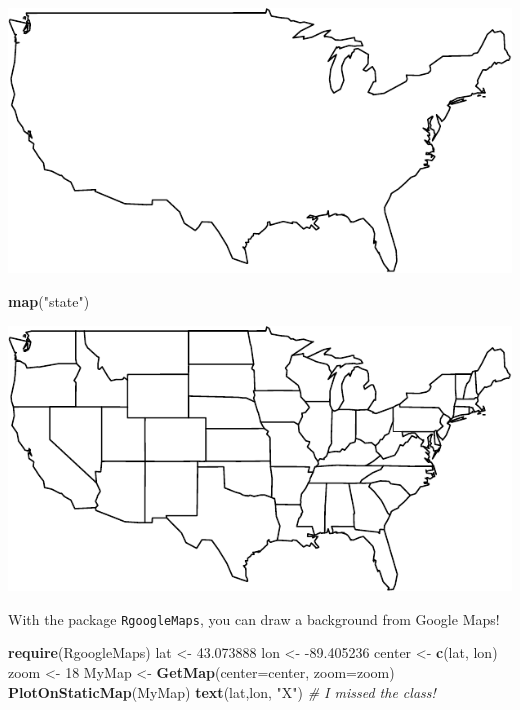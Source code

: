 \documentclass[]{article}
\newenvironment{Shaded}{\begin{snugshade}}{\end{snugshade}}
\newcommand{\KeywordTok}[1]{\textcolor[rgb]{0.13,0.29,0.53}{\textbf{{#1}}}}
\newcommand{\DataTypeTok}[1]{\textcolor[rgb]{0.13,0.29,0.53}{{#1}}}
\newcommand{\DecValTok}[1]{\textcolor[rgb]{0.00,0.00,0.81}{{#1}}}
\newcommand{\FloatTok}[1]{\textcolor[rgb]{0.00,0.00,0.81}{{#1}}}
\newcommand{\StringTok}[1]{\textcolor[rgb]{0.31,0.60,0.02}{{#1}}}
\newcommand{\CommentTok}[1]{\textcolor[rgb]{0.56,0.35,0.01}{\textit{{#1}}}}
\newcommand{\NormalTok}[1]{{#1}}
\numberwithin{equation}{section}
\begin{document}
\includegraphics{index_files/figure-latex/unnamed-chunk-239-1.pdf}

\begin{Shaded}
\begin{Highlighting}[]
\KeywordTok{map}\NormalTok{(}\StringTok{"state"}\NormalTok{)}
\end{Highlighting}
\end{Shaded}

\includegraphics{index_files/figure-latex/unnamed-chunk-239-2.pdf}

With the package \texttt{RgoogleMaps}, you can draw a background from
Google Maps!

\begin{Shaded}
\begin{Highlighting}[]
\KeywordTok{require}\NormalTok{(RgoogleMaps)}
\NormalTok{lat <-}\StringTok{ }\FloatTok{43.073888}
\NormalTok{lon <-}\StringTok{ }\NormalTok{-}\FloatTok{89.405236}
\NormalTok{center <-}\StringTok{ }\KeywordTok{c}\NormalTok{(lat, lon)}
\NormalTok{zoom <-}\StringTok{ }\DecValTok{18}
\NormalTok{MyMap <-}\StringTok{ }\KeywordTok{GetMap}\NormalTok{(}\DataTypeTok{center=}\NormalTok{center, }\DataTypeTok{zoom=}\NormalTok{zoom)}
\KeywordTok{PlotOnStaticMap}\NormalTok{(MyMap)}
\KeywordTok{text}\NormalTok{(lat,lon, }\StringTok{"X"}\NormalTok{) }\CommentTok{# I missed the class!}
\end{Highlighting}
\end{Shaded}
\end{document}
